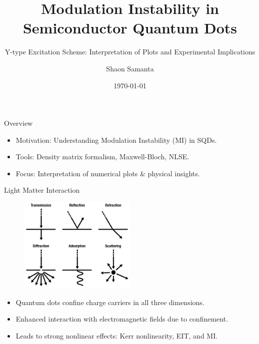 \documentclass[12pt,aspectratio=1610]{beamer}
\title{Modulation Instability in Semiconductor Quantum Dots}
\subtitle{Y-type Excitation Scheme: Interpretation of Plots and Experimental Implications}
\author{Shaon Samanta}
\institute{Department of Physics}
\date{\today}
\begin{document}
\frame{\titlepage}

\begin{frame}{Overview}
  \vspace{-3pt}
  \begin{itemize}
    \item Motivation: Understanding Modulation Instability (MI) in SQDs.
    \item Tools: Density matrix formalism, Maxwell-Bloch, NLSE\@.
    \item Focus: Interpretation of numerical plots \& physical insights.
  \end{itemize}
\end{frame}

\begin{frame}{Light Matter Interaction}
  \vspace{-20pt}
  \hspace*{55pt}
  \begin{figure}
    \includegraphics[width=0.5\textwidth]{Assets/Light Matter Interaction.jpeg}
  \end{figure}
  \begin{itemize}
    \item Quantum dots confine charge carriers in all three dimensions.
    \item Enhanced interaction with electromagnetic fields due to confinement.
    \item Leads to strong nonlinear effects: Kerr nonlinearity, EIT, and MI\@.
  \end{itemize}
\end{frame}
\end{document}
